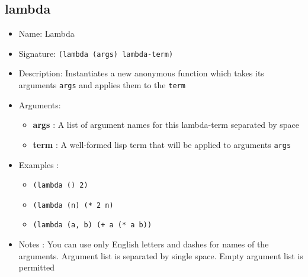 \subsection{lambda}
\begin{itemize}
    \item Name: Lambda
    \item Signature: \texttt{(lambda (args) lambda-term)}
    \item Description: Instantiates a new anonymous function which takes its arguments \texttt{args} and applies them to the \texttt{term}
    \item Arguments:
        \begin{itemize}
            \item \textbf{args} : A list of argument names for this lambda-term separated by space
            \item \textbf{term} : A well-formed lisp term that will be applied to arguments \texttt{args}
        \end{itemize}
    \item Examples :
        \begin{itemize}
            \item \texttt{(lambda () 2)}
            \item \texttt{(lambda (n) (* 2 n)}
            \item \texttt{(lambda (a, b) (+ a (* a b))}
        \end{itemize}
    \item Notes : You can use only English letters and dashes for names of the arguments. Argument list is separated by single space. Empty argument list is permitted
\end{itemize}


